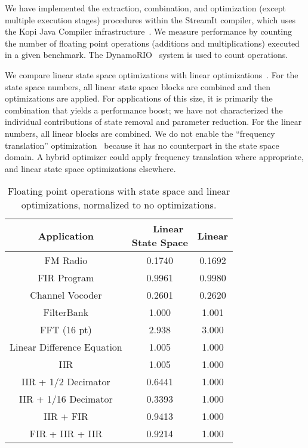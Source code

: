 \label{sec:results}

We have implemented the extraction, combination, and optimization
(except multiple execution stages) procedures within the StreamIt
compiler, which uses the Kopi Java Compiler
infrastructure~\cite{kopi}. We measure performance by counting the
number of floating point operations (additions and multiplications)
executed in a given benchmark. The DynamoRIO~\cite{dynamo} system is
used to count operations.

We compare linear state space optimizations with linear
optimizations~\cite{Lamb}.  For the state space numbers, all linear
state space blocks are combined and then optimizations are applied.
For applications of this size, it is primarily the combination that
yields a performance boost; we have not characterized the individual
contributions of state removal and parameter reduction.  For the
linear numbers, all linear blocks are combined.  We do not enable the
``frequency translation'' optimization~\cite{Lamb} because it has no
counterpart in the state space domain.  A hybrid optimizer could apply
frequency translation where appropriate, and linear state space
optimizations elsewhere.

\begin{table}[tbp]
\vspace{-12pt}
\small
\begin{center}
\begin{tabular} {c|c|c}
{\bf Application} & \parbox{0.7in}{{\bf ~~~Linear} \\ {\bf State Space}} & {\bf Linear} \\ \hline
FM Radio & 0.1740 & 0.1692 \\
FIR Program &  0.9961 & 0.9980 \\
Channel Vocoder & 0.2601 & 0.2620 \\
FilterBank & 1.000 & 1.001 \\
FFT (16 pt) & 2.938 & 3.000 \\
Linear Difference Equation & 1.005 & 1.000 \\
IIR & 1.005 & 1.000 \\
IIR + 1/2 Decimator & 0.6441 & 1.000 \\
IIR + 1/16 Decimator & 0.3393 & 1.000 \\
IIR + FIR & 0.9413 & 1.000 \\
FIR + IIR + IIR & 0.9214 & 1.000
\end{tabular}
\caption{Floating point operations with state space and linear
optimizations, normalized to no optimizations.\protect\label{tab:results}}
\end{center}
\vspace{-18pt}
\end{table}

